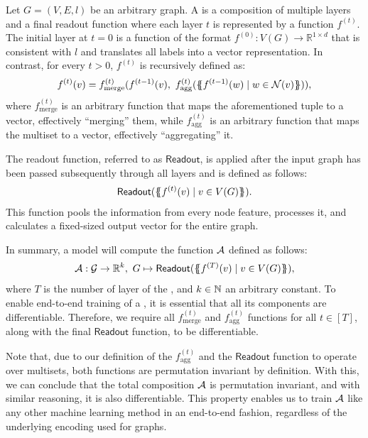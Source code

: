 \begin{definition}\label{def:gnn}
    Let $G = (V, E, l)$ be an arbitrary graph. A \gnn is a composition of multiple layers and a final readout function where each layer $t$ is represented by a function $f^{(t)}$. The initial layer at $t=0$ is a function of the format $f^{(0)}: V(G) \rightarrow \mathbb{R}^{1 \times d}$ that is consistent with $l$ and translates all labels into a vector representation. In contrast, for every $t > 0$, $f^{(t)}$ is recursively defined as:
    \begin{align*}
        f^{(t)}(v) = f^{(t)}_{\text{merge}} (f^{(t-1)}(v), \  f^{(t)}_{\text{agg}}( \{\!\!\{ f^{(t-1)}(w) \mid w \in \mathcal{N}(v) \}\!\!\} )),
    \end{align*}
    where $f^{(t)}_{\text{merge}}$ is an arbitrary function that maps the aforementioned tuple to a vector, effectively ``merging'' them, while $f^{(t)}_{\text{agg}}$ is an arbitrary function that maps the multiset to a vector, effectively ``aggregating'' it.
    
    The readout function, referred to as $\textsf{Readout}$, is applied after the input graph has been passed subsequently through all layers and is defined as follows:
    \begin{align*}
        \textsf{Readout}(\{\!\!\{ f^{(t)}(v) \mid v \in V(G) \}\!\!\}).
    \end{align*}
    This function pools the information from every node feature, processes it, and calculates a fixed-sized output vector for the entire graph.
    
    In summary, a \gnn model will compute the function $\mathcal{A}$ defined as follows:
    \begin{align*}
        \mathcal{A}: \mathcal{G} \rightarrow \mathbb{R}^k, \ G \mapsto \textsf{Readout}(\{\!\!\{ f^{(T)}(v) \mid v \in V(G) \}\!\!\}),
    \end{align*}
    where $T$ is the number of layer of the \gnn, and $k \in \mathbb{N}$ an arbitrary constant. To enable end-to-end training of a \gnn, it is essential that all its components are differentiable. Therefore, we require all $f^{(t)}_{\text{merge}}$ and $f^{(t)}_{\text{agg}}$ functions for all $t \in [T]$, along with the final $\textsf{Readout}$ function, to be differentiable.
\end{definition}
Note that, due to our definition of the $f^{(t)}_{\text{agg}}$ and the $\textsf{Readout}$ function to operate over multisets, both functions are permutation invariant by definition. With this, we can conclude that the total composition $\mathcal{A}$ is permutation invariant, and with similar reasoning, it is also differentiable. This property enables us to train $\mathcal{A}$ like any other machine learning method in an end-to-end fashion, regardless of the underlying encoding used for graphs. 


